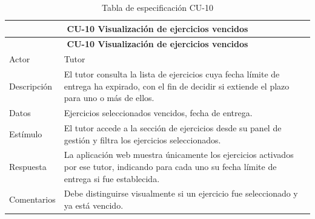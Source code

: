 \begin{longtable}{|p{4cm}|p{11cm}|}
\caption{Tabla de especificación CU-10}
\label{tab:cu10} \\

\hline
\multicolumn{2}{|c|}{\textbf{CU-10 Visualización de ejercicios vencidos}} \\
\hline
\endfirsthead

\hline
\multicolumn{2}{|c|}{\textbf{CU-10 Visualización de ejercicios vencidos}} \\
\hline
\endhead

\hline
\endfoot
\endlastfoot

Actor & Tutor \\
\hline

Descripción & El tutor consulta la lista de ejercicios cuya fecha límite de entrega ha expirado, con el fin de decidir si extiende el plazo para uno o más de ellos. \\
\hline

Datos & Ejercicios seleccionados vencidos, fecha de entrega. \\
\hline

Estímulo & El tutor accede a la sección de ejercicios desde su panel de gestión y filtra los ejercicios seleccionados. \\
\hline

Respuesta & La aplicación web muestra únicamente los ejercicios activados por ese tutor, indicando para cada uno su fecha límite de entrega si fue establecida. \\
\hline

Comentarios & Debe distinguirse visualmente si un ejercicio fue seleccionado y ya está vencido. \\
\hline

\end{longtable}



